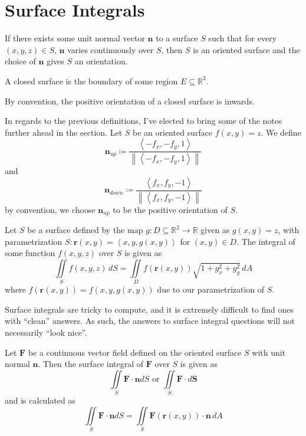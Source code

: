 \section{Surface Integrals}
\begin{definition}
    If there exists some unit normal vector \(\mathbf{n}\) to a surface \(S\) such that for every \((x,y,z)\in S\), \(\mathbf{n}\) varies continuously over \(S\), then \(S\) is an oriented surface and the choice of \(\mathbf{n}\) gives \(S\) an orientation.
\end{definition}
\begin{definition}
    A closed surface is the boundary of some region \(E\subseteq \mathbb{R}^3\).
\end{definition}
\begin{definition}
    By convention, the positive orientation of a closed surface is inwards.
\end{definition}
In regards to the previous definitions, I've elected to bring some of the notes further ahead in the section. Let \(S\) be an oriented surface \(f(x,y)=z\). We define
\[
    \mathbf{n}_{up} \coloneqq \frac{\left\langle -f_x,-f_y,1 \right\rangle }{\left\lVert \left\langle -f_x,-f_y,1 \right\rangle \right\rVert }
\]
and
\[
    \mathbf{n}_{down} \coloneqq \frac{\left\langle f_x,f_y,-1 \right\rangle }{\left\lVert \left\langle f_x,f_y,-1 \right\rangle \right\rVert }
\]
by convention, we choose \(\mathbf{n}_{up}  \) to be the positive orientation of \(S\).
\begin{theorem}
    Let \(S\) be a surface defined by the map \(g:D\subseteq \mathbb{R}^2\to \mathbb{R}\) given as \(g(x,y)=z\), with parametrization \(S:\mathbf{r}(x,y)=\left\langle x,y,g(x,y) \right\rangle \) for \((x,y)\in D\). The integral of some function \(f(x,y,z)\) over \(S\) is given as 
    \[
        \iint\limits_{S}f(x,y,z)\,dS = \iint\limits_{D}f(\mathbf{r}(x,y))\sqrt{1+g_x^2 +g_y^2}\,dA
    \]
    where \(f(\mathbf{r}(x,y))=f(x,y,g(x,y))\) due to our parametrization of \(S\).
\end{theorem}
\begin{remark}
    Surface integrals are tricky to compute, and it is extremely difficult to find ones with ``clean'' answers. As such, the answers to surface integral questions will not necessarily ``look nice''.
\end{remark}
\begin{theorem}
    Let \(\mathbf{F}\) be a continuous vector field defined on the oriented surface \(S\) with unit normal \(\mathbf{n}\). Then the surface integral of \(\mathbf{F}\) over \(S\) is given as 
    \[
        \iint\limits_{S}\mathbf{F}\cdot \mathbf{n}dS \text{ or }  \iint\limits_{S}\mathbf{F}\cdot d \mathbf{S}
    \]
    and is calculated as 
    \[
        \iint\limits_{S}\mathbf{F}\cdot \mathbf{n}dS = \iint\limits_{S}\mathbf{F}(\mathbf{r}(x,y))\cdot \mathbf{n}\,dA
    \]
\end{theorem}
